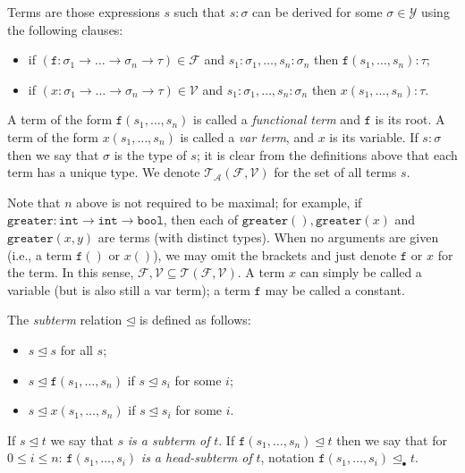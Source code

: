 \documentclass{lmcs}
\theoremstyle{theorem}\newtheorem{theorem}{Theorem}
\theoremstyle{theorem}\newtheorem{lemma}[theorem]{Lemma}
\theoremstyle{theorem}\newtheorem{corollary}[theorem]{Corollary}
\theoremstyle{definition}\newtheorem{definition}[theorem]{Definition}
\theoremstyle{definition}\newtheorem{example}[theorem]{Example}
\newcommand{\F}{\mathcal{F}}
\newcommand{\V}{\mathcal{V}}
\newcommand{\Types}{\mathcal{Y}}
\newcommand{\Terms}{\mathcal{T}}
\newcommand{\ATerms}{\mathcal{T}_{\mathcal{A}}}
\newcommand{\atype}{\sigma}
\newcommand{\btype}{\tau}
\newcommand{\identifier}[1]{\mathtt{#1}}
\newcommand{\afun}{\identifier{f}}
\newcommand{\avar}{x}
\newcommand{\bvar}{y}
\newcommand{\abs}[2]{\lambda #1.#2}
\newcommand{\arrtype}{\rightarrow}
\newcommand{\subtermeq}{\unlhd}
\newcommand{\headsubtermeq}{\unlhd_{\bullet}}
\newcommand{\symb}[1]{\mathtt{#1}}
\begin{document}
Terms are those expressions $s$ such that $s : \atype$ can be derived for some $\atype \in \Types$
using the following clauses:
\begin{itemize}
\item if $(\afun : \atype_1 \arrtype \dots \arrtype \atype_n \arrtype \btype) \in \F$ and
  $s_1 : \atype_1,\dots,s_n : \atype_n$ then $\afun(s_1,\dots,s_n) : \btype$;
\item if $(\avar : \atype_1 \arrtype \dots \arrtype \atype_n \arrtype \btype) \in \V$ and
  $s_1 : \atype_1,\dots,s_n : \atype_n$ then $\avar(s_1,\dots,s_n) : \btype$.
\end{itemize}
A term of the form $\afun(s_1,\dots,s_n)$ is called a \emph{functional term} and $\afun$ is its
root.
A term of the form $\avar(s_1,\dots,s_n)$ is called a \emph{var term}, and $\avar$ is its variable.
If $s : \atype$ then we say that $\atype$ is the type of $s$; it is clear from the definitions
above that each term has a unique type.
We denote $\ATerms(\F,\V)$ for the set of all terms $s$.

Note that $n$ above is not required to be maximal; for example, if $\symb{greater} : \mathtt{int}
\arrtype \mathtt{int} \arrtype \mathtt{bool}$, then each of $\symb{greater}(),
\symb{greater}(\avar)$ and $\symb{greater}(\avar,\bvar)$ are terms (with distinct types).
When no arguments are given (i.e., a term $\afun()$ or $\avar()$), we may omit the brackets and
just denote $\afun$ or $\avar$ for the term.  In this sense, $\F,\V \subseteq \Terms(\F,\V)$.  A
term $\avar$ can simply be called a variable (but is also still a var term); a term $\afun$ may be
called a constant.

The \emph{subterm} relation $\subtermeq$ is defined as follows:
\begin{itemize}
\item $s \subtermeq s$ for all $s$;
\item $s \subtermeq \afun(s_1,\dots,s_n)$ if $s \subtermeq s_i$ for some $i$;
\item $s \subtermeq \avar(s_1,\dots,s_n)$ if $s \subtermeq s_i$ for some $i$.
\end{itemize}
If $s \subtermeq t$ we say that $s$ \emph{is a subterm of} $t$.  If $\afun(s_1,\dots,s_n) \subtermeq
t$ then we say that for $0 \leq i \leq n$: $\afun(s_1,\dots,s_i)$ \emph{is a head-subterm of} $t$,
notation $\afun(s_1,\dots,s_i) \headsubtermeq t$.
\end{document}
